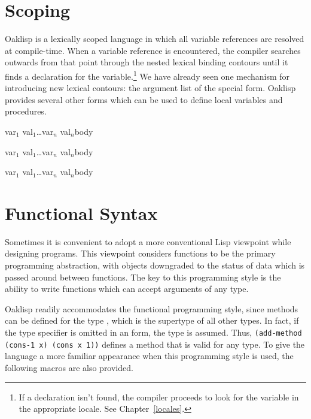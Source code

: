 \section{Scoping}

Oaklisp is a lexically scoped language in which all variable
references are resolved at compile-time.  When a variable reference is
encountered, the compiler searches outwards from that point through
the nested lexical binding contours until it finds a declaration for
the variable.\footnote{If a declaration isn't found, the compiler
proceeds to look for the variable in the appropriate locale. See
Chapter~\ref{locales}.} We have already seen one mechanism for
introducing new lexical contours: the argument list of the
 special form.  Oaklisp provides several other forms
which can be used to define local variables and procedures.

{\lpar\lpar var$_1$ val$_1$\rpar\ldots var$_n$ val$_n$\rpar \dt body}

{\lpar\lpar var$_1$ val$_1$\rpar\ldots var$_n$ val$_n$\rpar \dt body}

{\lpar\lpar var$_1$ val$_1$\rpar\ldots\lpar var$_n$ val$_n$\rpar\rpar \dt body}


\section{Functional Syntax}

Sometimes it is convenient to adopt a more conventional Lisp
viewpoint while designing programs.  This viewpoint considers functions
to be the primary programming abstraction, with objects downgraded to
the status of data which is passed around between functions. The key
to this programming style is the ability to write functions which can accept
arguments of any type.

Oaklisp readily accommodates the functional programming style, since
methods can be defined for the type , which is the
supertype of all other types.  In fact, if the type specifier is
omitted in an  form, the type  is assumed.
Thus, \texttt{(add-method (\mbox{cons-1} x) (cons x 1))} defines a method that
is valid for any type.  To give the language a more familiar
appearance when this programming style is used, the following macros
are also provided.

